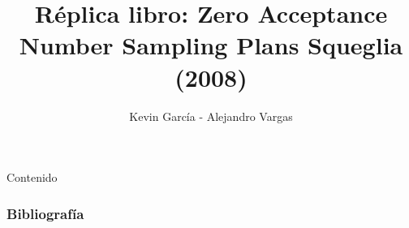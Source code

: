 \documentclass[10pt]{beamer}
\author{Kevin García - Alejandro Vargas}
\title{Réplica libro: Zero Acceptance Number Sampling Plans Squeglia (2008)}
\begin{document}
\begin{frame}[plain]
\maketitle
\end{frame}

\begin{frame}{Contenido}
\tableofcontents
\end{frame}


\begin{frame}
  \frametitle{Bibliografía}
  
\nocite{A0}
  
  
  
\end{frame}
\end{document}
